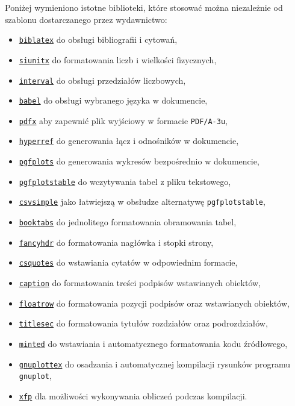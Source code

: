 Poniżej wymieniono istotne biblioteki, które stosować można niezależnie od szablonu dostarczanego przez wydawnictwo:
\begin{itemize}
\item \texttt{\href{https://ctan.org/pkg/biblatex}{biblatex}} do obsługi bibliografii i cytowań,
\item \texttt{\href{https://ctan.org/pkg/siunitx}{siunitx}} do formatowania liczb i wielkości fizycznych,
\item \texttt{\href{https://ctan.org/pkg/interval}{interval}} do obsługi przedziałów liczbowych,
\item \texttt{\href{https://ctan.org/pkg/babel-polish}{babel}} do obsługi wybranego języka w dokumencie,
\item \texttt{\href{https://ctan.org/pkg/pdfx}{pdfx}} aby zapewnić plik wyjściowy w formacie \texttt{PDF/A-3u},
\item \texttt{\href{https://ctan.org/pkg/hyperref}{hyperref}} do generowania łącz i odnośników w dokumencie,
\item \texttt{\href{https://ctan.org/pkg/pgfplots}{pgfplots}} do generowania wykresów bezpośrednio w dokumencie,
\item \texttt{\href{https://ctan.org/pkg/pgfplots}{pgfplotstable}} do wczytywania tabel z pliku tekstowego,
\item \texttt{\href{https://ctan.org/pkg/csvsimple}{csvsimple}} jako łatwiejszą w obsłudze alternatywę \texttt{pgfplotstable},
\item \texttt{\href{https://ctan.org/pkg/booktabs}{booktabs}} do jednolitego formatowania obramowania tabel,
\item \texttt{\href{https://ctan.org/pkg/fancyhdr}{fancyhdr}} do formatowania nagłówka i stopki strony,
\item \texttt{\href{https://ctan.org/pkg/csquotes}{csquotes}} do wstawiania cytatów w odpowiednim formacie,
\item \texttt{\href{https://ctan.org/pkg/caption}{caption}} do formatowania treści podpisów wstawianych obiektów,
\item \texttt{\href{https://ctan.org/pkg/floatrow}{floatrow}} do formatowania pozycji podpisów oraz wstawianych obiektów,
\item \texttt{\href{https://ctan.org/pkg/titlesec}{titlesec}} do formatowania tytułów rozdziałów oraz podrozdziałów,
\item \texttt{\href{https://ctan.org/pkg/minted}{minted}} do wstawiania i automatycznego formatowania kodu źródłowego,
\item \texttt{\href{https://ctan.org/pkg/gnuplottex}{gnuplottex}} do osadzania i automatycznej kompilacji rysunków programu \texttt{gnuplot},
\item \texttt{\href{https://ctan.org/pkg/xfp}{xfp}} dla możliwości wykonywania obliczeń podczas kompilacji.
\end{itemize}

